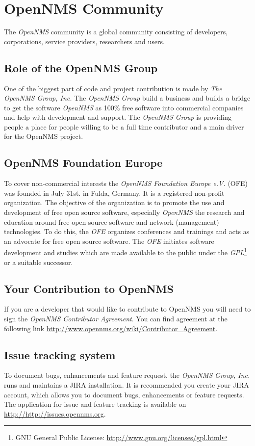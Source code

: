\section{OpenNMS Community}
The \emph{OpenNMS} community is a global community consisting of developers, corporations, service providers, researchers and users.

\subsection*{Role of the OpenNMS Group}
One of the biggest part of code and project contribution is made by \emph{The OpenNMS Group, Inc.} The \emph{OpenNMS Group} build a business and builds a bridge to get the software \emph{OpenNMS} as 100\% free software into commercial companies and help with development and support. The \emph{OpenNMS Group} is providing people a place for people willing to be a full time contributor and a main driver for the OpenNMS project.

\subsection*{OpenNMS Foundation Europe}
To cover non-commercial interests the \emph{OpenNMS Foundation Europe e.V.} (OFE) was founded in July 31st. in Fulda, Germany. It is a registered non-profit organization. The objective of the organization is to promote the use and development of free open source software, especially \emph{OpenNMS} the research and education around free open source software and network (management) technologies. To do this, the \emph{OFE} organizes conferences and trainings and acts as an advocate for free open source software. The \emph{OFE} initiates software development and studies which are made available to the public under the \emph{GPL}\footnote{GNU General Public License: \url{http://www.gnu.org/licenses/gpl.html}} or a suitable successor.

\subsection*{Your Contribution to OpenNMS}
If you are a developer that would like to contribute to OpenNMS you will need to sign the \emph{OpenNMS Contributor Agreement}. You can find agreement at the following link \url{http://www.opennms.org/wiki/Contributor_Agreement}.

\subsection*{Issue tracking system}
To document bugs, enhancements and feature request, the \emph{OpenNMS Group, Inc.} runs and maintains a JIRA installation. It is recommended you create your JIRA account, which allows you to document bugs, enhancements or feature requests. The application for issue and feature tracking is available on \url{http://http://issues.opennms.org}.